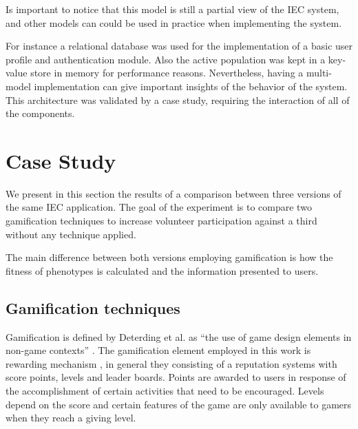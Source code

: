 \documentclass[conference]{IEEEtran}
\begin{document}
Is important to notice that this model is still a partial view of the IEC system,
and other models can could be used in practice when implementing the
system. %

For instance a relational database was used for the implementation of a 
basic user profile and authentication module. Also the active population 
was kept in a key-value store in memory for performance reasons.  
Nevertheless, having a multi-model implementation can give important 
insights of the behavior of the system. This architecture was validated
by a case study, requiring the interaction of all of the components.        

\section{Case Study}
\label{sec:experiments}

We present in this section the results of a comparison between three versions
of the same IEC application. The goal of the experiment is to compare two 
gamification techniques to increase volunteer participation against a third 
without any technique applied.

The main difference between both versions employing gamification is how the fitness of phenotypes
is calculated and the information presented to users. 

\subsection{Gamification techniques}
\label{sec:gamification}

Gamification is defined by Deterding et al. as
``the use of game design elements in non-game contexts'' \cite{deterding2011game}.
The gamification element employed in this work is rewarding mechanism 
\cite{dubois2013understanding}, in general they consisting of a reputation systems with score points, 
levels and leader boards. Points are awarded to users in response of
the accomplishment of certain activities that need to be encouraged. Levels depend
on the score and certain features of the game are only available to gamers when 
they reach a giving level.
\end{document}
